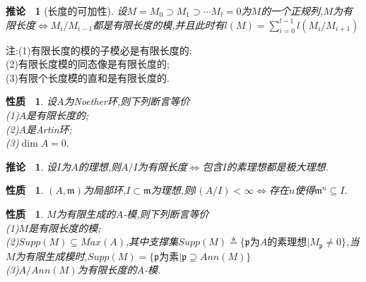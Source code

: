\documentclass[b5paper,oneside]{ctexbook}
\newcommand{\mf}[1]{\mathfrak{#1}}
\theoremstyle{plain}
\newtheorem{prop}[thm]{性质~}
\newtheorem{cor}[thm]{推论~}
\theoremstyle{definition}
\begin{document}
\begin{cor}[长度的可加性]设$M=M_0\supset M_1\supset \cdots M_l=0$为$M$的一个正规列,$M$为有限长度$\Leftrightarrow M_i/M_{i-1}$都是有限长度的模,并且此时有$l(M)=\sum\limits_{i=0}^{l-1}l(M_i/M_{i+1})$
\end{cor}
\noindent
注:(1)有限长度的模的子模必是有限长度的;\\
(2)有限长度模的同态像是有限长度的;\\
(3)有限个长度模的直和是有限长度的.
\begin{prop}设$A$为Noether环,则下列断言等价\\
(1)$A$是有限长度的;\\
(2)$A$是Artin环;\\
(3)$\dim A=0.$
\end{prop}
\begin{cor}设$I$为$A$的理想,则$A/I$为有限长度$\Leftrightarrow$包含$I$的素理想都是极大理想.
\end{cor}

\begin{prop}$(A,\mf{m})$为局部环,$I\subset \mf{m}$为理想,则$l(A/I)<\infty \Leftrightarrow$存在$n$使得$\mf{m}^n\subseteq I.$
\end{prop}
\begin{prop}$M$为有限生成的$A$-模,则下列断言等价\\
(1)$M$是有限长度的模;\\
(2)$Supp(M)\subseteq Max(A)$,其中支撑集$Supp(M)\triangleq \{\mf{p}\text{为}A\text{的素理想}|M_{\mf{p}}\neq 0\}$,当$M$为有限生成模时,$Supp(M)=\{\mf{p}\text{为素}|\mf{p}\supseteq Ann(M)\}$\\
(3)$A/Ann(M)$为有限长度的$A$-模.
\end{prop}
\end{document}
